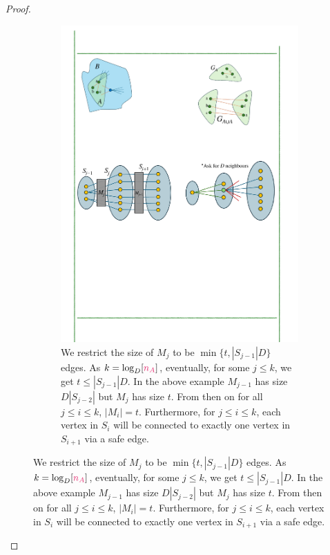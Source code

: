 \documentclass[11pt]{article}
\begin{document}
\begin{proof}
\begin{figure}[t!]
\begin{subfigure}[t]{0.95\textwidth}
        \label{subfig:embeddingA}
    \end{subfigure}%
    \hspace{1mm}
    \hspace{1mm}
    \begin{subfigure}[t]{0.95\textwidth}
        \centering
        \includegraphics[]{assets/embeddingB.pdf}
        \caption{We restrict the size of $M_j$ to be $\min\{t, |S_{j-1}|D\}$ edges. As $k = \log_{D}[\na]$, eventually, for some $j \leq k$, we get $t \leq |S_{j-1}|D$.
        In the above example $M_{j-1}$ has size $D|S_{j-2}|$ but $M_j$ has size $t$. 
        From then on for all $j \leq i \leq k$, $|M_i|= t$.
        Furthermore, for $j \leq i \leq k$,  each vertex in $S_i$ will be connected to exactly one vertex in $S_{i+1}$ via a safe edge.
        }
        \label{subfig:embeddingB}        
    \end{subfigure}
\end{figure}



\end{proof}
\end{document}
